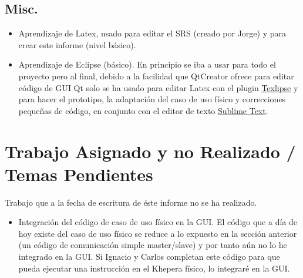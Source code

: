 \documentclass{article}
\begin{document}
\subsection{Misc.}
 \begin{itemize}
   \item Aprendizaje de Latex, usado para editar el SRS (creado por Jorge) y
   para crear este informe (nivel básico).
   \item Aprendizaje de Eclipse (básico). En principio se iba a usar para todo
   el proyecto pero al final, debido a la facilidad que QtCreator ofrece para
   editar código de GUI Qt solo se ha usado para editar Latex con el plugin
   \href{http://texlipse.sourceforge.net/}{Texlipse} y para hacer el prototipo,
   la adaptación del caso de uso físico y correcciones pequeñas de código, en
   conjunto con el editor de texto \href{http://www.sublimetext.com/}{Sublime Text}.
 \end{itemize}

\section{Trabajo Asignado y no Realizado / Temas Pendientes}
Trabajo que a la fecha de escritura de éste informe no se ha realizado.
	\begin{itemize}
	  \item Integración del código de caso de uso físico en la GUI.
	  \subitem El código que a día de hoy existe del caso de uso físico se reduce a
	  lo expuesto en la sección anterior (un código de comunicación simple
	  master/slave) y por tanto aún no lo he integrado en la GUI. Si Ignacio y
	  Carlos completan este código para que pueda ejecutar una instrucción en el
	  Khepera físico, lo integraré en la GUI.
	\end{itemize}
\end{document}
